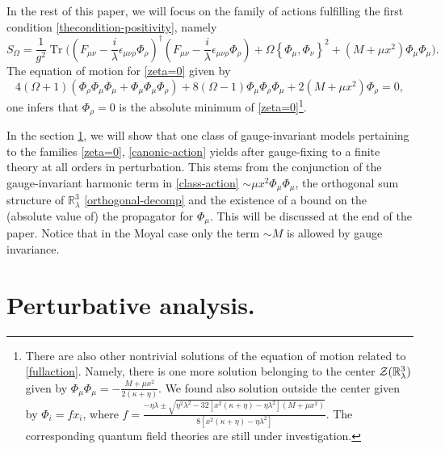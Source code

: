 \documentclass[a4paper,11pt,twoside]{article}
\numberwithin{equation}{section}
\DeclareMathOperator{\tr}{Tr}
\theoremstyle{nonumberplain}
\newcounter{and}
\begin{document}
In the rest of this paper, we will focus on the family of actions fulfilling the first condition \eqref{thecondition-positivity}, namely
\begin{equation}
S_\Omega = \frac{1}{g^2} \tr\big((F_{\mu\nu} - \frac{i}{\lambda} \epsilon_{\mu\nu\rho} \Phi_\rho)^\dag (F_{\mu\nu} - \frac{i}{\lambda} \epsilon_{\mu\nu\rho} \Phi_\rho) + \Omega\left\{\Phi_\mu,\Phi_\nu\right\}^2 + (M+\mu x^2) \Phi_\mu \Phi_\mu \big) \label{zeta=0}.
\end{equation}
The equation of motion for \eqref{zeta=0} given by
\begin{equation}
4(\Omega+1)(\Phi_\rho\Phi_\mu\Phi_\mu+\Phi_\mu\Phi_\mu\Phi_\rho)+8(\Omega-1)\Phi_\mu\Phi_\rho\Phi_\mu+2(M+\mu x^2) \Phi_\rho = 0\label{eqn-motion},
\end{equation}
one infers that $\Phi_\rho=0$ is the absolute minimum of \eqref{zeta=0}\footnote{There are also other nontrivial solutions of the equation of motion related to \eqref{fullaction}. Namely, there is one more solution belonging to the center ${\cal{Z}}(\mathbb{R}^3_\lambda)$ given by $\Phi_{\mu}\Phi_{\mu}=-\frac{M+\mu x^2}{2(\kappa+\eta)}$. We found also solution outside the center given by $\Phi_i=fx_i$, where $f=\frac{-\eta\lambda\pm\sqrt{\eta^2\lambda^2-32\left[x^2(\kappa+\eta)-\eta\lambda^2\right](M+\mu x^2)}}{8\left[x^2(\kappa+\eta)-\eta\lambda^2\right]}$. The corresponding quantum field theories are still under investigation. }.\par

In the section \ref{section3}, we will show that one class of gauge-invariant models pertaining to the families \eqref{zeta=0}, \eqref{canonic-action} yields after gauge-fixing to a finite theory at all orders in perturbation. This stems from the conjunction of the gauge-invariant harmonic term in \eqref{class-action} $\sim \mu x^2\Phi_\mu\Phi_\mu$, the orthogonal sum structure of $\mathbb{R}^3_\lambda$ \eqref{orthogonal-decomp} and the existence of a bound on the (absolute value of) the propagator for $\Phi_\mu$. This will be discussed at the end of the paper. Notice that in the Moyal case only the term $\sim M$ is allowed by gauge invariance.



\section{Perturbative analysis.}\label{section3}
\end{document}
